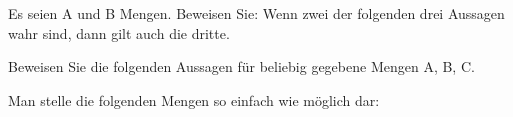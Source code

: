 \documentclass[10pt, a4paper]{exam}
\begin{document}
\begin{questions}

    \question Es seien A und B Mengen. Beweisen Sie: Wenn zwei der folgenden drei Aussagen wahr sind, dann gilt auch die dritte.

    \question Beweisen Sie die folgenden Aussagen für beliebig gegebene Mengen A, B, C.

    \question Man stelle die folgenden Mengen so einfach wie möglich dar:


\end{questions}
\end{document}
